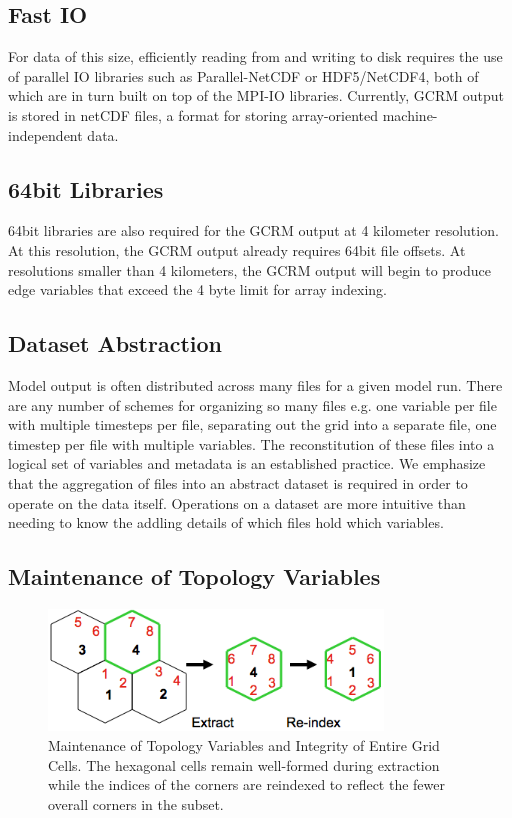 \subsection{Fast IO}

For data of this size, efficiently reading from and writing to disk requires
the use of parallel IO libraries such as Parallel-NetCDF\cite{PNETCDF} or
HDF5/NetCDF4\cite{HDF5}\cite{NETCDF}, both of which are in turn built on top
of the MPI-IO libraries\cite{MPIIO}.  Currently, GCRM output is stored in
netCDF\cite{NETCDF} files, a format for storing array-oriented
machine-independent data.

\subsection{64bit Libraries}

64bit libraries are also required for the GCRM output at 4 kilometer
resolution.  At this resolution, the GCRM output already requires 64bit file
offsets.  At resolutions smaller than 4 kilometers, the GCRM output will begin
to produce edge variables that exceed the 4 byte limit for array indexing.

\subsection{Dataset Abstraction}

Model output is often distributed across many files for a given model run.
There are any number of schemes for organizing so many files e.g. one variable
per file with multiple timesteps per file, separating out the grid into a
separate file, one timestep per file with multiple variables.  The
reconstitution of these files into a logical set of variables and metadata is
an established practice\cite{NcML,THREDDS}.  We emphasize that the aggregation
of files into an abstract dataset is required in order to operate on the data
itself.  Operations on a dataset are more intuitive than needing to know the
addling details of which files hold which variables.

\subsection{Maintenance of Topology Variables}

\begin{figure}[!t]
\center
\includegraphics[width=3.5in]{images/Subset1}
\caption{Maintenance of Topology Variables and Integrity of Entire Grid Cells.
The hexagonal cells remain well-formed during extraction while the indices of
the corners are reindexed to reflect the fewer overall corners in the subset.}
\label{fig:subset}
\end{figure}

